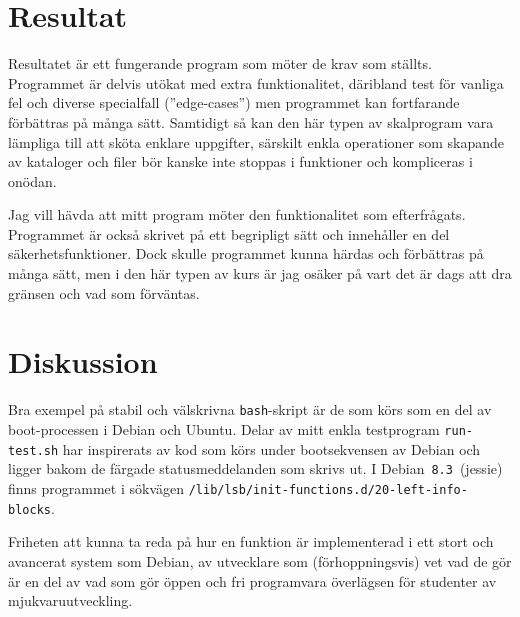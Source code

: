 %


\section{Resultat}
Resultatet är ett fungerande program som möter de krav som ställts.
Programmet är delvis utökat med extra funktionalitet, däribland test för vanliga
fel och diverse specialfall (''edge-cases'') men programmet kan fortfarande 
förbättras på många sätt. Samtidigt så kan den här typen av skalprogram vara
lämpliga till att sköta enklare uppgifter, särskilt enkla operationer som 
skapande av kataloger och filer bör kanske inte stoppas i funktioner och
kompliceras i onödan.

Jag vill hävda att mitt program möter den funktionalitet som efterfrågats.
Programmet är också skrivet på ett begripligt sätt och innehåller en del
säkerhetsfunktioner. Dock skulle programmet kunna härdas och förbättras på
många sätt, men i den här typen av kurs är jag osäker på vart det är dags 
att dra gränsen och vad som förväntas.


\section{Diskussion}
Bra exempel på stabil och välskrivna \texttt{bash}-skript är de som körs som en
del av boot-processen i Debian och Ubuntu. Delar av mitt enkla testprogram
\texttt{run-test.sh} har inspirerats av kod som körs under bootsekvensen av
Debian och ligger bakom de färgade statusmeddelanden som skrivs ut. I
\mbox{Debian \texttt{8.3} (jessie)} finns programmet i sökvägen
\texttt{/lib/lsb/init-functions.d/20-left-info-blocks}.

Friheten att kunna ta reda på hur en funktion är implementerad i ett stort och
avancerat system som Debian, av utvecklare som (förhoppningsvis) vet vad de gör
är en del av vad som gör öppen och fri programvara överlägsen för studenter av
mjukvaruutveckling.

